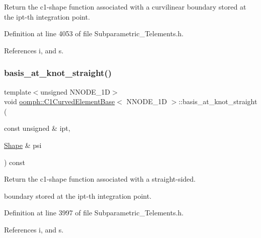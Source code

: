 Return the c1-\/shape function associated with a curvilinear boundary stored at the ipt-\/th integration point. 



Definition at line 4053 of file Subparametric\+\_\+\+Telements.\+h.



References i, and s.

\mbox{\label{classoomph_1_1C1CurvedElementBase_a5b3e87cecd6887bfc7bcae8f52ebe9e4}} 
\subsubsection{\texorpdfstring{basis\+\_\+at\+\_\+knot\+\_\+straight()}{basis\_at\_knot\_straight()}}
{\footnotesize\ttfamily template$<$unsigned N\+N\+O\+D\+E\+\_\+1D$>$ \\
void \hyperlink{classoomph_1_1C1CurvedElementBase}{oomph\+::\+C1\+Curved\+Element\+Base}$<$ N\+N\+O\+D\+E\+\_\+1D $>$\+::basis\+\_\+at\+\_\+knot\+\_\+straight (\begin{DoxyParamCaption}\item[{const unsigned \&}]{ipt,  }\item[{\hyperlink{classoomph_1_1Shape}{Shape} \&}]{psi }\end{DoxyParamCaption}) const\hspace{0.3cm}{\ttfamily [inline]}}



Return the c1-\/shape function associated with a straight-\/sided. 

boundary stored at the ipt-\/th integration point. 

Definition at line 3997 of file Subparametric\+\_\+\+Telements.\+h.



References i, and s.

\mbox{\label{classoomph_1_1C1CurvedElementBase_af8dc76a0a5b61c9995e172007b96a3bd}} 
